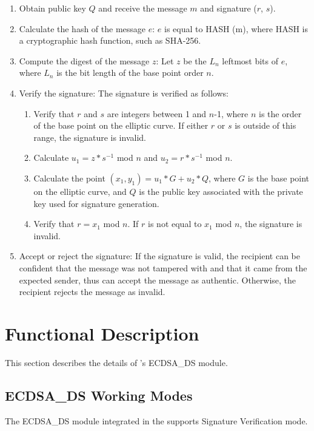 \documentclass[main\_\_EN.tex]{subfiles}
\begin{document}
\begin{enumerate}
    \item Obtain public key $Q$ and receive the message $m$ and signature ($r$, $s$).
    \item Calculate the hash of the message $e$: $e$ is equal to HASH (m), where HASH is a cryptographic hash function, such as SHA-256.
    \item Compute the digest of the message $z$: Let $z$ be the $L_n$ leftmost bits of $e$, where $L_n$ is the bit length of the base point order $n$.
    \item Verify the signature: The signature is verified as follows:
        \begin{enumerate}
            \item Verify that $r$ and $s$ are integers between 1 and $n$-1, where $n$ is the order of the base point on the elliptic curve. If either $r$ or $s$ is outside of this range, the signature is invalid.
            \item Calculate $u_1 = z * s^{-1}$ mod $n$ and $u_2 = r * s^{-1}$ mod $n$.
            \item Calculate the point $(x_1, y_1) = u_1 * G + u_2 * Q$, where $G$ is the base point on the elliptic curve, and $Q$ is the public key associated with the private key used for signature generation.
            \item Verify that $r = x_1$ \textrm{mod} $n$. If $r$ is not equal to $x_1$ mod $n$, the signature is invalid.
        \end{enumerate}
    \item Accept or reject the signature: If the signature is valid, the recipient can be confident that the message was not tampered with and that it came from the expected sender, thus can accept the message as authentic. Otherwise, the recipient rejects the message as invalid.
\end{enumerate}

\section{Functional Description}

This section describes the details of \chipname{}'s ECDSA\_DS module.

\subsection{ECDSA\_DS Working Modes}

The ECDSA\_DS module integrated in the \chipname{} supports Signature Verification mode.
\end{document}
